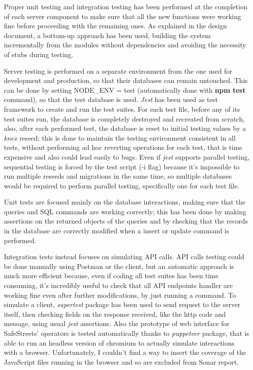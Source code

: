 Proper unit testing and integration testing has been performed at the completion of each server component to make sure that all the new functions were working fine before proceeding with the remaining ones. As explained in the design document, a bottom-up approach has been used, building the system incrementally from the modules without dependencies and avoiding the necessity of stubs during testing.

Server testing is performed on a separate environment from the one used for development and production, so that their databases can remain untouched. This can be done by setting NODE\_ENV = test (automatically done with \textbf{npm test} command), so that the test database is used. \textit{Jest} has been used as test framework to create and run the test suites. For each test file, before any of its test suites run, the database is completely destroyed and recreated from scratch, also, after each performed test, the database is reset to initial testing values by a \textit{knex} reseed; this is done to maintain the testing environment consistent in all tests, without performing ad hoc reverting operations for each test, that is time expensive and also could lead easily to bugs. Even if \textit{jest} supports parallel testing, sequential testing is forced by the test script (-i flag) because it's impossible to run multiple reseeds and migrations in the same time, so multiple databases would be required to perform parallel testing, specifically one for each test file.

Unit tests are focused mainly on the database interactions, making sure that the queries and SQL commands are working correctly; this has been done by making assertions on the returned objects of the queries and by checking that the records in the database are correctly modified when a insert or update command is performed.

Integration tests instead focuses on simulating API calls. API calls testing could be done manually using Postman or the client, but an automatic approach is much more efficient because, even if coding all test suites has been time consuming, it's incredibly useful to check that all API endpoints handler are working fine even after further modifications, by just running a command. To simulate a client, \textit{supertest} package has been used to send request to the server itself, then checking fields on the response received, like the http code and message, using usual \textit{jest} assertions. Also the prototype of web interface for SafeStreets' operators is tested automatically thanks to \textit{puppeteer} package, that is able to run an headless version of chromium to actually simulate interactions with a browser. Unfortunately, I couldn't find a way to insert the coverage of the JavaScript files running in the browser and so are excluded from Sonar report.

